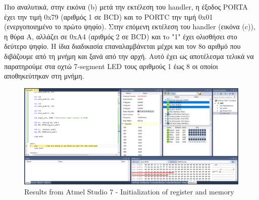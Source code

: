 \documentclass{article}
\begin{document}
	\noindent
	Πιο αναλυτικά, στην εικόνα (b) μετά την εκτέλεση του handler, η έξοδος PORTA έχει την τιμή 0x79 (αριθμός 1 σε BCD) και το PORTC την τιμή 0x01 (ενεργοποιημένο το πρώτο ψηφίο). Στην επόμενη εκτέλεση του handler (εικόνα (c)), η θύρα A, αλλάζει σε 0xΑ4 (αριθμός 2 σε BCD) και τo "1" έχει ολισθήσει στο δεύτερο ψηφίο. Η ίδια διαδικασία επαναλαμβάνεται μέχρι και τον 8ο αριθμό που διβάζουμε από τη μνήμη και ξανά από την αρχή. Αυτό έχει ως αποτέλεσμα τελικά να παρατηρούμε στα οχτώ 7-segment LED τους αριθμούς 1 έως 8 οι οποίοι αποθηκεύτηκαν στη μνήμη.
	
	\begin{figure}[h!]
		\centering
		\includegraphics[width=\linewidth]{./results/lab2_after_init.png}
		\caption{Results from Αtmel Studio 7 - Ιnitialization of register and memory}
	\end{figure}
	
\end{document}

